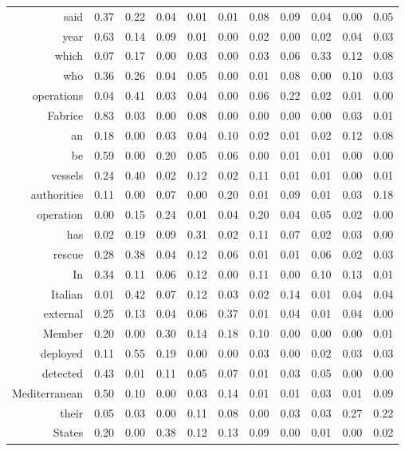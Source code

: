 \begin{longtable}{rrrrrrrrrrr}
  said & 0.37 & 0.22 & 0.04 & 0.01 & 0.01 & 0.08 & 0.09 & 0.04 & 0.00 & 0.05 \\ 
  year & 0.63 & 0.14 & 0.09 & 0.01 & 0.00 & 0.02 & 0.00 & 0.02 & 0.04 & 0.03 \\ 
  which & 0.07 & 0.17 & 0.00 & 0.03 & 0.00 & 0.03 & 0.06 & 0.33 & 0.12 & 0.08 \\ 
  who & 0.36 & 0.26 & 0.04 & 0.05 & 0.00 & 0.01 & 0.08 & 0.00 & 0.10 & 0.03 \\ 
  operations & 0.04 & 0.41 & 0.03 & 0.04 & 0.00 & 0.06 & 0.22 & 0.02 & 0.01 & 0.00 \\ 
  Fabrice & 0.83 & 0.03 & 0.00 & 0.08 & 0.00 & 0.00 & 0.00 & 0.00 & 0.03 & 0.01 \\ 
  an & 0.18 & 0.00 & 0.03 & 0.04 & 0.10 & 0.02 & 0.01 & 0.02 & 0.12 & 0.08 \\ 
  be & 0.59 & 0.00 & 0.20 & 0.05 & 0.06 & 0.00 & 0.01 & 0.01 & 0.00 & 0.00 \\ 
  vessels & 0.24 & 0.40 & 0.02 & 0.12 & 0.02 & 0.11 & 0.01 & 0.01 & 0.00 & 0.01 \\ 
  authorities & 0.11 & 0.00 & 0.07 & 0.00 & 0.20 & 0.01 & 0.09 & 0.01 & 0.03 & 0.18 \\ 
  operation & 0.00 & 0.15 & 0.24 & 0.01 & 0.04 & 0.20 & 0.04 & 0.05 & 0.02 & 0.00 \\ 
  has & 0.02 & 0.19 & 0.09 & 0.31 & 0.02 & 0.11 & 0.07 & 0.02 & 0.03 & 0.00 \\ 
  rescue & 0.28 & 0.38 & 0.04 & 0.12 & 0.06 & 0.01 & 0.01 & 0.06 & 0.02 & 0.03 \\ 
  In & 0.34 & 0.11 & 0.06 & 0.12 & 0.00 & 0.11 & 0.00 & 0.10 & 0.13 & 0.01 \\ 
  Italian & 0.01 & 0.42 & 0.07 & 0.12 & 0.03 & 0.02 & 0.14 & 0.01 & 0.04 & 0.04 \\ 
  external & 0.25 & 0.13 & 0.04 & 0.06 & 0.37 & 0.01 & 0.04 & 0.01 & 0.04 & 0.00 \\ 
  Member & 0.20 & 0.00 & 0.30 & 0.14 & 0.18 & 0.10 & 0.00 & 0.00 & 0.00 & 0.01 \\ 
  deployed & 0.11 & 0.55 & 0.19 & 0.00 & 0.00 & 0.03 & 0.00 & 0.02 & 0.03 & 0.03 \\ 
  detected & 0.43 & 0.01 & 0.11 & 0.05 & 0.07 & 0.01 & 0.03 & 0.05 & 0.00 & 0.00 \\ 
  Mediterranean & 0.50 & 0.10 & 0.00 & 0.03 & 0.14 & 0.01 & 0.01 & 0.03 & 0.01 & 0.09 \\ 
  their & 0.05 & 0.03 & 0.00 & 0.11 & 0.08 & 0.00 & 0.03 & 0.03 & 0.27 & 0.22 \\ 
  States & 0.20 & 0.00 & 0.38 & 0.12 & 0.13 & 0.09 & 0.00 & 0.01 & 0.00 & 0.02 \\ 

\end{longtable}
